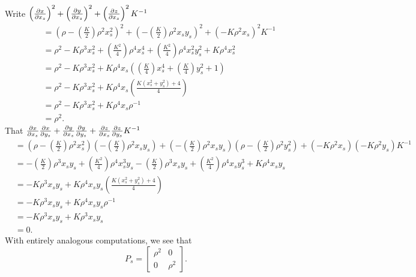 \documentclass[hints,handout,12pt,noauthor,nooutcomes]{ximera}
\begin{document}
\begin{problem}
\begin{freeResponse}
  Write $\left(\pp[x]{x_s}\right)^2 + \left(\pp[y]{x_s}\right)^2 +\left(\pp[z]{x_s}\right)^2K^{-1}$
  \begin{align*}
    &=\left(\rho-\left(\frac{K}{2}\right)\rho^2x_s^2\right)^2 + \left(-\left(\frac{K}{2}\right)\rho^2x_sy_s\right)^2 +\left(-K\rho^2x_s\right)^2K^{-1}\\
    &=\rho^2 -K\rho^3x_s^2 + \left(\frac{K^2}{4}\right)\rho^4x_s^4 + \left(\frac{K^2}{4}\right)\rho^4x_s^2y_s^2 + K\rho^4x_s^2\\
    &=\rho^2 -K\rho^3x_s^2 + K\rho^4x_s\left(\left(\frac{K}{4}\right)x_s^4 + \left(\frac{K}{4}\right)y_s^2 + 1\right)\\
    &=\rho^2 -K\rho^3x_s^2 + K\rho^4x_s\left(\frac{K\left(x_s^2+y_s^2\right)+4}{4}\right)\\
    &=\rho^2 -K\rho^3x_s^2 + K\rho^4x_s\rho^{-1}\\
    &=\rho^2.
  \end{align*}
  That $\pp[x]{x_s}\pp[x]{y_s} + \pp[y]{x_s}\pp[y]{y_s} + \pp[z]{x_s}\pp[z]{y_s} K^{-1}$
  \begin{align*}
    &=\left(\rho-\left(\frac{K}{2}\right)\rho^2x_s^2\right)\left(-\left(\frac{K}{2}\right)\rho^2x_sy_s\right)
    + \left(-\left(\frac{K}{2}\right)\rho^2x_sy_s\right)\left(\rho-\left(\frac{K}{2}\right)\rho^2y_s^2\right)
    + \left(-K\rho^2x_s\right)\left(-K\rho^2y_s\right) K^{-1}\\
    &=
    -\left(\frac{K}{2}\right)\rho^3x_sy_s+\left(\frac{K^2}{4}\right)\rho^4x_s^3y_s
    -\left(\frac{K}{2}\right)\rho^3x_sy_s+\left(\frac{K^2}{4}\right)\rho^4x_sy_s^3
    + K\rho^4 x_sy_s\\
    &= -K\rho^3x_sy_s + K\rho^4x_sy_s\left(\frac{K\left(x_s^2+y_s^2\right)+4}{4}\right)\\
    &= -K\rho^3x_sy_s + K\rho^4x_sy_s\rho^{-1}\\
    &= -K\rho^3x_sy_s + K\rho^3x_sy_s\\
    &=0.
  \end{align*}
  With entirely analogous computations, we see that 
    \[
    P_s =
    \begin{bmatrix}
      \rho^2 & 0\\
      0 & \rho^2
    \end{bmatrix}.
    \]


\end{freeResponse}

\end{problem}
\end{document}
